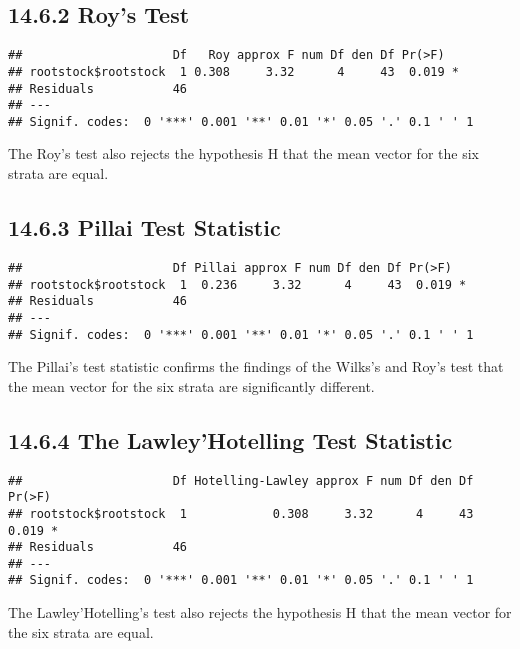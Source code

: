 \documentclass[]{article}
\begin{document}
\hypertarget{roys-test}{%
\subsection{14.6.2 Roy's Test}\label{roys-test}}

\begin{verbatim}
##                     Df   Roy approx F num Df den Df Pr(>F)  
## rootstock$rootstock  1 0.308     3.32      4     43  0.019 *
## Residuals           46                                      
## ---
## Signif. codes:  0 '***' 0.001 '**' 0.01 '*' 0.05 '.' 0.1 ' ' 1
\end{verbatim}

The Roy's test also rejects the hypothesis H that the mean vector for
the six strata are equal.

\hypertarget{pillai-test-statistic}{%
\subsection{14.6.3 Pillai Test Statistic}\label{pillai-test-statistic}}

\begin{verbatim}
##                     Df Pillai approx F num Df den Df Pr(>F)  
## rootstock$rootstock  1  0.236     3.32      4     43  0.019 *
## Residuals           46                                       
## ---
## Signif. codes:  0 '***' 0.001 '**' 0.01 '*' 0.05 '.' 0.1 ' ' 1
\end{verbatim}

The Pillai's test statistic confirms the findings of the Wilks's and
Roy's test that the mean vector for the six strata are significantly
different.

\hypertarget{the-lawleyhotelling-test-statistic}{%
\subsection{14.6.4 The Lawley'Hotelling Test
Statistic}\label{the-lawleyhotelling-test-statistic}}

\begin{verbatim}
##                     Df Hotelling-Lawley approx F num Df den Df Pr(>F)  
## rootstock$rootstock  1            0.308     3.32      4     43  0.019 *
## Residuals           46                                                 
## ---
## Signif. codes:  0 '***' 0.001 '**' 0.01 '*' 0.05 '.' 0.1 ' ' 1
\end{verbatim}

The Lawley'Hotelling's test also rejects the hypothesis H that the mean
vector for the six strata are equal.
\end{document}
